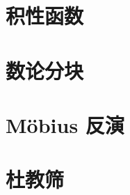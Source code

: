 \section{积性函数}
\label{mulf:sec:mulf}


\questions


\section{数论分块}
\label{mulf:sec:div-blocking}


\questions


\section{M\"obius 反演}
\label{mulf:sec:mobius-inverse}


\questions


\section{杜教筛}
\label{mulf:sec:du-seive}


\questions
